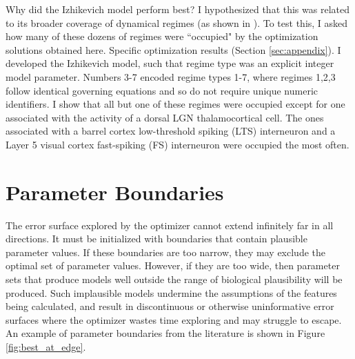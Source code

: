 Why did the Izhikevich model perform best? I hypothesized that this was related to its broader coverage of dynamical regimes (as shown in \citep{izhikevich2003simple}).
To test this, I asked how many of these dozens of regimes were ``occupied" by the optimization solutions obtained here. Specific optimization results (Section \ref{sec:appendix}). I developed the Izhikevich model, such that regime type was an explicit integer model parameter. Numbers 3-7 encoded regime types 1-7, where regimes 1,2,3 follow identical governing equations and so do not require unique numeric identifiers. I show that all but one of these regimes were occupied except for one associated with the activity of a dorsal LGN thalamocortical cell.
The ones associated with a barrel cortex low-threshold spiking (LTS) interneuron and a Layer 5 visual cortex fast-spiking (FS) interneuron were occupied the most often. 


\section{Parameter Boundaries}
The error surface explored by the optimizer cannot extend infinitely far in all directions.
It must be initialized with boundaries that contain plausible parameter values.
If these boundaries are too narrow, they may exclude the optimal set of parameter values.
However, if they are too wide, then parameter sets that produce models well outside the range of biological plausibility will be produced.
Such implausible models undermine the assumptions of the features being calculated, and result in discontinuous or otherwise uninformative error surfaces where the optimizer wastes time exploring and may struggle to escape.
An example of parameter boundaries from the literature is shown in Figure \ref{fig:best_at_edge}.


